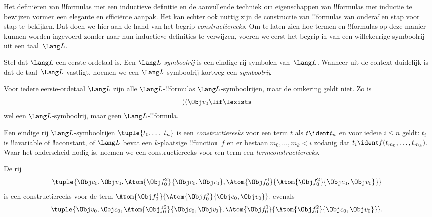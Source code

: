 \documentclass[../../../include/open-logic-section]{subfiles}
\begin{document}


Het definiëren van !!{formula}s met een inductieve definitie en de
aanvullende techniek om eigenschappen van !!{formula}s met inductie te
bewijzen vormen een elegante en efficiënte aanpak. Het kan echter ook
nuttig zijn de constructie van !!{formula}s van onderaf en stap voor
stap te bekijken. Dat doen we hier aan de hand van het begrip
\emph{constructiereeks}.
%
Om te laten zien hoe termen en !!{formula}s op deze manier kunnen worden
ingevoerd zonder naar hun inductieve definities te verwijzen, voeren we
eerst het begrip in van een willekeurige symboolrij uit een taal~$\Lang L$.

\begin{defn}[Symboolrijen]
Stel dat $\Lang L$ een eerste-ordetaal is. Een \emph{$\Lang
L$-symboolrij} is een eindige rij symbolen van~$\Lang L$. Wanneer uit de
context duidelijk is dat de taal~$\Lang L$ vastligt, noemen we een
$\Lang L$-symboolrij kortweg een \emph{symboolrij}.
\end{defn}

\begin{ex}
Voor iedere eerste-ordetaal $\Lang L$ zijn alle
$\Lang L$-!!{formula}s $\Lang L$-symboolrijen, maar de omkering geldt
niet. Zo is \[)(\Obj v_0\lif\lexists\] wel een
$\Lang L$-symboolrij, maar geen $\Lang L$-!!{formula}.
\end{ex}

\begin{defn}
Een eindige rij $\Lang L$-symboolrijen $\tuple{t_0,\dotsc,t_n}$ is een
\emph{constructiereeks} voor een term $t$ als $t \ident t_n$ en voor
iedere $i \leq n$ geldt: $t_i$ is !!a{variable} of !!a{constant}, of
$\Lang L$ bevat een $k$-plaatsige !!{function}~$f$ en er bestaan
$m_0,\dotsc,m_k < i$ zodanig dat $t_i \ident
f(t_{m_0},\dotsc,t_{m_k})$. Waar het onderscheid nodig is, noemen we
een constructiereeks voor een term een \emph{termconstructiereeks}.
\end{defn}

\begin{ex}
De rij
\[
    \tuple{\Obj c_0, \Obj v_0, \Atom{\Obj f^2_0}{\Obj c_0, \Obj v_0}, \Atom{\Obj f^1_0}{\Atom{\Obj f^2_0}{\Obj c_0, \Obj v_0}}}
\]
is een constructiereeks voor de term $\Atom{\Obj f^1_0}{\Atom{\Obj
f^2_0}{\Obj c_0, \Obj v_0}}$, evenals
\[
    \tuple{\Obj v_0, \Obj c_0, \Atom{\Obj f^2_0}{\Obj c_0, \Obj v_0}, \Atom{\Obj f^1_0}{\Atom{\Obj f^2_0}{\Obj c_0, \Obj v_0}}}.
\]
\end{ex}
\end{document}
